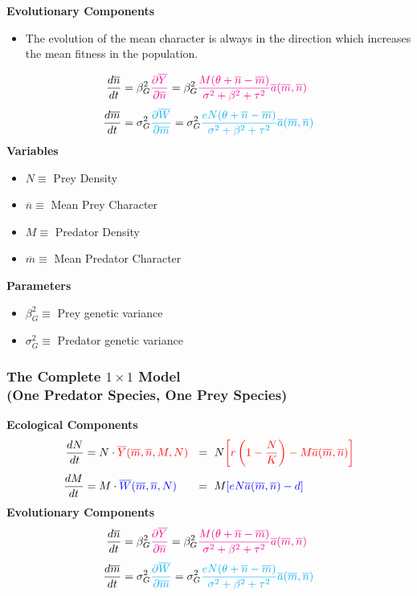 \documentclass[10pt]{beamer}
\begin{document}
\begin{frame}
	\frametitle{}
	{\bf Evolutionary Components}
	\begin{itemize}
		\item The evolution of the mean character is always {\color{red} in the direction which increases the mean fitness in the population}.
	\end{itemize}
	\begin{align*}
	\frac{d\overline{n}}{dt} &= \beta_G^2{\color{magenta}\frac{\partial \overline{Y}}{\partial \overline{n}}} = \beta_G^2{\color{magenta}\frac{M(\theta + \overline{n} - \overline{m})}{\sigma^2 + \beta^2 + \tau^2} \overline{a}(\overline{m}, \overline{n})}\\[.1cm]
	\frac{d\overline{m}}{dt} &= \sigma_G^2{\color{cyan}\frac{\partial \overline{W}}{\partial \overline{m}}} = \sigma_G^2{\color{cyan}\frac{eN(\theta + \overline{n} - \overline{m})}{\sigma^2 + \beta^2 + \tau^2} \overline{a}(\overline{m}, \overline{n})}\\
	\end{align*}
	{\bf Variables}
	\begin{itemize}
		\item $N \equiv $ Prey Density
		\item $\overline{n} \equiv $ Mean Prey Character
		\item $M \equiv $ Predator Density
		\item $\overline{m} \equiv $ Mean Predator Character
	\end{itemize}
	{\bf Parameters}
	\begin{itemize}
		\item $\beta_G^2 \equiv $ Prey genetic variance
		\item $\sigma_G^2 \equiv $ Predator genetic variance
	\end{itemize}
\end{frame}
\begin{frame}
	\frametitle{The Complete $1\times1$ Model \\ (One Predator Species, One Prey Species)}
	{\bf Ecological Components}
	\begin{align*}
	\frac{dN}{dt} &= N\cdot {\color{red}\overline{Y}(\overline{m}, \overline{n}, M, N)}\ \ =\ N{\color{red}\left[r\left(1 - \frac{N}{K}\right) - M\overline{a}(\overline{m}, \overline{n})\right]}\\[.1cm]
	\frac{dM}{dt} &= M\cdot {\color{blue}\overline{W}(\overline{m}, \overline{n}, N)}\ \ \ \ \ =\ M{\color{blue}\left[eN\overline{a}(\overline{m}, \overline{n}) - d\right]}
	\end{align*}
	{\bf Evolutionary Components}
	\begin{align*}
	\frac{d\overline{n}}{dt} &= \beta_G^2{\color{magenta}\frac{\partial \overline{Y}}{\partial \overline{n}}} = \beta_G^2{\color{magenta}\frac{M(\theta + \overline{n} - \overline{m})}{\sigma^2 + \beta^2 + \tau^2} \overline{a}(\overline{m}, \overline{n})}\\[.1cm]
	\frac{d\overline{m}}{dt} &= \sigma_G^2{\color{cyan}\frac{\partial \overline{W}}{\partial \overline{m}}} = \sigma_G^2{\color{cyan}\frac{eN(\theta + \overline{n} - \overline{m})}{\sigma^2 + \beta^2 + \tau^2} \overline{a}(\overline{m}, \overline{n})}
	\end{align*}
\end{frame}
\end{document}

